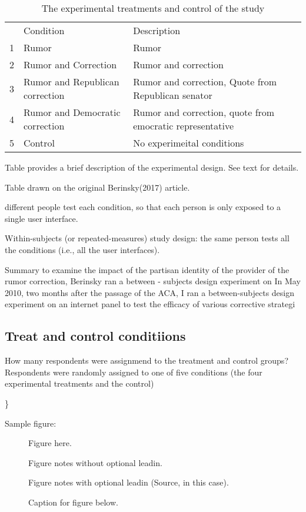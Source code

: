 \documentclass[AER]{AEA}
\begin{document}
\begin{table}
\caption{The experimental treatments and control of the study}

\begin{tabular}{lll}
& Condition & Description \\
1 & Rumor & Rumor \\
2 & Rumor and Correction & Rumor and correction \\
3 & Rumor and Republican correction & Rumor and correction, Quote from Republican senator \\
4 & Rumor and Democratic correction & Rumor and correction, quote from emocratic representative \\
5 & Control & No experimeital conditions
\end{tabular}
\begin{tablenotes}
Table provides a brief description of the experimental design. See text for details.
\end{tablenotes}
\begin{tablenotes}[Source]
Table drawn on the original Berinsky(2017) article.
\end{tablenotes}
\end{table}

different people test each condition, so that each person is only
exposed to a single user interface.

Within-subjects (or repeated-measures) study design: the same person
tests all the conditions (i.e., all the user interfaces).

Summary to examine the impact of the partisan identity of the provider
of the rumor correction, Berinsky ran a between - subjects design
experiment on In May 2010, two months after the passage of the ACA, I
ran a between-subjects design experiment on an internet panel to test
the efficacy of various corrective strategi

\subsection{Treat and control conditiions}

How many respondents were assignmend to the treatment and control
groups? Respondents were randomly assigned to one of five conditions
(the four experimental treatments and the control)

\}

Sample figure:

\begin{figure}
Figure here.

\caption{Caption for figure below.}
\begin{figurenotes}
Figure notes without optional leadin.
\end{figurenotes}
\begin{figurenotes}[Source]
Figure notes with optional leadin (Source, in this case).
\end{figurenotes}
\end{figure}
\end{document}
